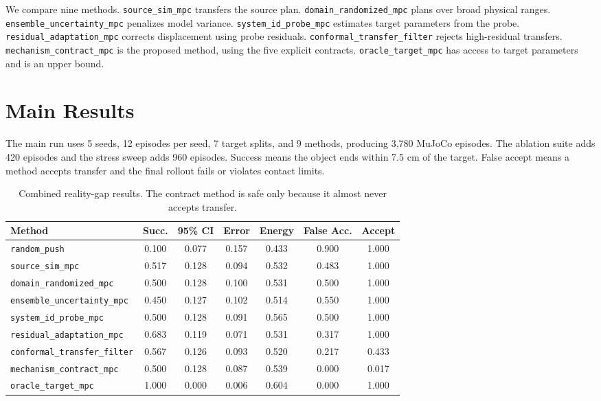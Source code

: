 \documentclass{article}
\begin{document}
We compare nine methods.
\texttt{source\_sim\_mpc} transfers the source plan.
\texttt{domain\_randomized\_mpc} plans over broad physical ranges.
\texttt{ensemble\_uncertainty\_mpc} penalizes model variance.
\texttt{system\_id\_probe\_mpc} estimates target parameters from the probe.
\texttt{residual\_adaptation\_mpc} corrects displacement using probe residuals.
\texttt{conformal\_transfer\_filter} rejects high-residual transfers.
\texttt{mechanism\_contract\_mpc} is the proposed method, using the five explicit contracts.
\texttt{oracle\_target\_mpc} has access to target parameters and is an upper bound.

\section{Main Results}
The main run uses 5 seeds, 12 episodes per seed, 7 target splits, and 9 methods, producing 3,780 MuJoCo episodes.
The ablation suite adds 420 episodes and the stress sweep adds 960 episodes.
Success means the object ends within 7.5 cm of the target.
False accept means a method accepts transfer and the final rollout fails or violates contact limits.

\begin{table}[t]
\centering
\caption{Combined reality-gap results. The contract method is safe only because it almost never accepts transfer.}
\label{tab:combined}
\begin{tabular}{lcccccc}
\toprule
Method & Succ. & 95\% CI & Error & Energy & False Acc. & Accept \\
\midrule
\texttt{random\_push} & 0.100 & 0.077 & 0.157 & 0.433 & 0.900 & 1.000 \\
\texttt{source\_sim\_mpc} & 0.517 & 0.128 & 0.094 & 0.532 & 0.483 & 1.000 \\
\texttt{domain\_randomized\_mpc} & 0.500 & 0.128 & 0.100 & 0.531 & 0.500 & 1.000 \\
\texttt{ensemble\_uncertainty\_mpc} & 0.450 & 0.127 & 0.102 & 0.514 & 0.550 & 1.000 \\
\texttt{system\_id\_probe\_mpc} & 0.500 & 0.128 & 0.091 & 0.565 & 0.500 & 1.000 \\
\texttt{residual\_adaptation\_mpc} & 0.683 & 0.119 & 0.071 & 0.531 & 0.317 & 1.000 \\
\texttt{conformal\_transfer\_filter} & 0.567 & 0.126 & 0.093 & 0.520 & 0.217 & 0.433 \\
\texttt{mechanism\_contract\_mpc} & 0.500 & 0.128 & 0.087 & 0.539 & 0.000 & 0.017 \\
\texttt{oracle\_target\_mpc} & 1.000 & 0.000 & 0.006 & 0.604 & 0.000 & 1.000 \\
\bottomrule
\end{tabular}
\end{table}
\end{document}
